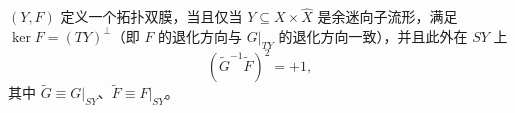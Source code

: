 

\begin{proposition}[3] $(Y,F)$ 定义一个拓扑双膜，当且仅当 $Y\subseteq X\times\widehat X$ 是余迷向子流形，满足 $\ker F=(TY)^\perp$（即 $F$ 的退化方向与 $G|_{TY}$ 的退化方向一致），并且此外在 $SY$ 上
\[
  (\widetilde G^{-1}\widetilde F)^2=+1,
\]
其中 $\widetilde G\equiv G|_{SY}$、$\widetilde F\equiv F|_{SY}$。\end{proposition}

